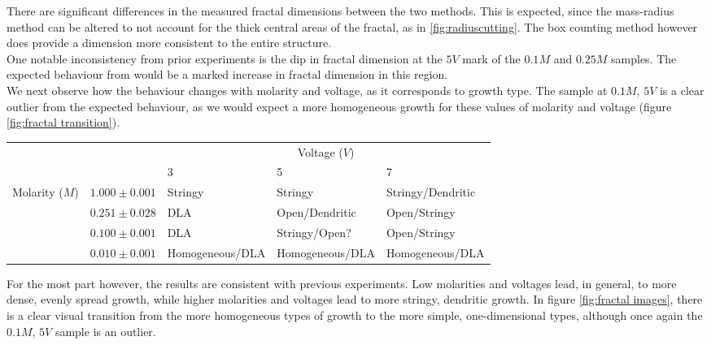 \documentclass{article}
\theoremstyle{definition}
\theoremstyle{remark}
\begin{document}
There are significant differences in the measured fractal dimensions between the two methods. This is expected, since the mass-radius method can be altered to not account for the thick central areas of the fractal, as in \ref{fig:radiuscutting}. The box counting method however does provide a dimension more consistent to the entire structure.\\
\indent One notable inconsistency from prior experiments is the dip in fractal dimension at the $5V$ mark of the $0.1M$ and $0.25M$ samples. The expected behaviour from \cite{PhysRevLett.59.2315} would be a marked increase in fractal dimension in this region.\\
\indent We next observe how the behaviour changes with molarity and voltage, as it corresponds to growth type. The sample at $0.1M$, $5V$ is a clear outlier from the expected behaviour, as we would expect a more homogeneous growth for these values of molarity and voltage (figure \ref{fig:fractal transition}).\\
\begin{center}
\begin{tabular}{|ll|l|l|l|}
        \hline
             ~& ~& \multicolumn{3}{c|}{Voltage ($V$)} \\ \cline{3-5}
             ~& ~& 3 & 5 & 7 \\ \hline
            \multirow{4}{*}{Molarity ($M$)} & $1.000\pm0.001$ & Stringy & Stringy & Stringy/Dendritic \\
            & $0.251\pm0.028$ & DLA & Open/Dendritic & Open/Stringy \\     
            & $0.100\pm0.001$ & DLA & Stringy/Open? & Open/Stringy \\
            & $0.010\pm0.001$ & Homogeneous/DLA & Homogeneous/DLA & Homogeneous/DLA \\ \hline
 \end{tabular}
\end{center}
For the most part however, the results are consistent with previous experiments. Low molarities and voltages lead, in general, to more dense, evenly spread growth, while higher molarities and voltages lead to more stringy, dendritic growth. In figure \ref{fig:fractal images}, there is a clear visual transition from the  more homogeneous types of growth to the more simple, one-dimensional types, although once again the $0.1M$, $5V$ sample is an outlier.\\
\end{document}
